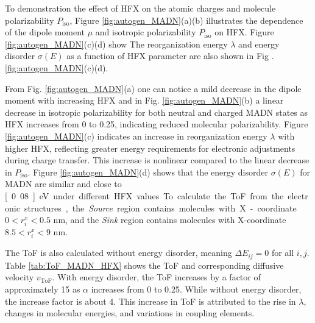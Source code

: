 \documentclass[%
 reprint,
 amsmath,amssymb,
 aps,
]{revtex4-2}
\begin{document}
To demonstration the effect of HFX on the atomic charges and molecule polarizability $P_\text{iso}$,
Figure \ref{fig:autogen_MADN}(a)(b) illustrates the dependence of the dipole moment $\mu$ and isotropic polarizability $P_\text{iso}$ on HFX.
Figure \ref{fig:autogen_MADN}(c)(d) show 
The reorganization energy $\lambda$ and energy disorder $\sigma(E)$ as a function of HFX parameter are also shown in Fig .\ref{fig:autogen_MADN}(c)(d).

From Fig. \ref{fig:autogen_MADN}(a) one can notice a mild decrease in the dipole moment with increasing HFX and in Fig. \ref{fig:autogen_MADN}(b) a linear decrease in isotropic polarizability for both neutral and charged MADN states as HFX increases from 0 to 0.25, indicating reduced molecular polarizability.
Figure \ref{fig:autogen_MADN}(c) indicates an increase in reorganization energy $\lambda$ with higher HFX, reflecting greater energy requirements for electronic adjustments during charge transfer. This increase is nonlinear compared to the linear decrease in $P_\text{iso}$.
Figure \ref{fig:autogen_MADN}(d) shows that the energy disorder $\sigma(E)$ for MADN are similar and close to \unit[0.08]{eV} under different HFX values.

To calculate the ToF from the electronic structures, the \textit{Source} region contains molecules with X-coordinate $0 < r^x_i < 0.5$ nm, and the \textit{Sink} region contains molecules with X-coordinate $8.5 < r^x_i < 9$ nm. 

The ToF is also calculated without energy disorder, meaning $\Delta E_{ij}=0$ for all $i,j$.
Table \ref{tab:ToF_MADN_HFX} shows the ToF and corresponding diffusive velocity $v_\text{ToF}$.
With energy disorder, the ToF increases by a factor of approximately 15 as $\alpha$ increases from 0 to 0.25.  
While without energy disorder, the increase factor is about 4. This increase in ToF is attributed to the rise in $\lambda$, changes in molecular energies, and variations in coupling elements.
\end{document}
